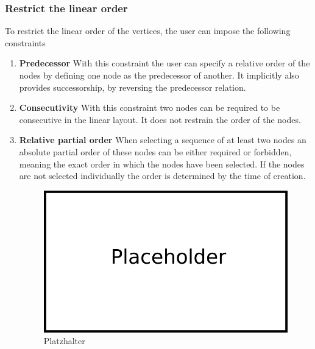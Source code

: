 \subsubsection{Restrict the linear order}
To restrict the linear order of the vertices, the user can impose the following constraints %
\begin{enumerate}
\item \textbf{Predecessor}
With this constraint the user can specify a relative order of the nodes by defining one node as the predecessor of another. It implicitly also provides successorship, by reversing the predecessor relation.
\item \textbf{Consecutivity} With this constraint two nodes can be required to be consecutive in the linear layout. It does not restrain the order of the nodes.
\item \textbf{Relative partial order} When selecting a sequence of at least two nodes an absolute partial order of these nodes can be either required or forbidden, meaning the exact order in which the nodes have been selected. If the nodes are not selected individually the order is determined by the time of creation.
\begin{figure}[!h]
\begin{center}
\includegraphics[width=1\textwidth]{figures/Platzhalter.png}
\caption{Platzhalter}
\label{img:plzhltr}
\end{center}
\end{figure}
\end{enumerate}
